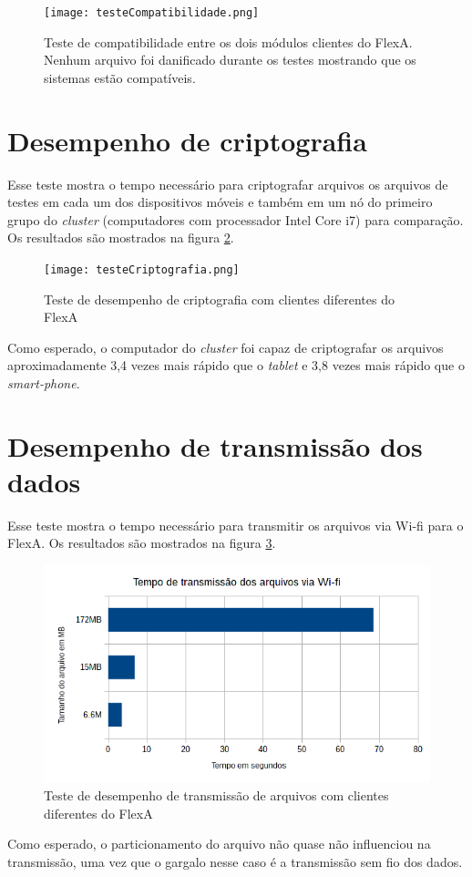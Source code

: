     \begin{figure}[!ht]
    \centering
    \texttt{[image: testeCompatibilidade.png]}
    \caption{Teste de compatibilidade entre os dois módulos clientes do FlexA. Nenhum arquivo foi danificado durante os testes mostrando que os sistemas estão compatíveis.}
    \label{fig:testeCompatibilidade}
    \end{figure}
    
\section{Desempenho de criptografia}

    Esse teste mostra o tempo necessário para criptografar arquivos os arquivos de testes em cada um dos dispositivos móveis e também em um nó do primeiro grupo do \textit{cluster} (computadores com processador Intel Core i7) para comparação. Os resultados são mostrados na figura \ref{fig:testesCriptografia}.
    
    \begin{figure}[!ht]
    \centering
    \texttt{[image: testeCriptografia.png]}
    \caption{Teste de desempenho de criptografia com clientes diferentes do FlexA}
    \label{fig:testesCriptografia}
    \end{figure}
    
    Como esperado, o computador do \textit{cluster} foi capaz de criptografar os arquivos aproximadamente 3,4 vezes mais rápido que o \textit{tablet} e 3,8 vezes mais rápido que o \textit{smart-phone}.
    
\section{Desempenho de transmissão dos dados}

    Esse teste mostra o tempo necessário para transmitir os arquivos via Wi-fi para o FlexA. Os resultados são mostrados na figura \ref{fig:testeTransmissao}.
    
    \begin{figure}[!ht]
    \centering
    \includegraphics[width=14cm]{testeTransmissao.png}
    \caption{Teste de desempenho de transmissão de arquivos com clientes diferentes do FlexA}
    \label{fig:testeTransmissao}
    \end{figure}
    
    Como esperado, o particionamento do arquivo não quase não influenciou na transmissão, uma vez que o gargalo nesse caso é a transmissão sem fio dos dados.